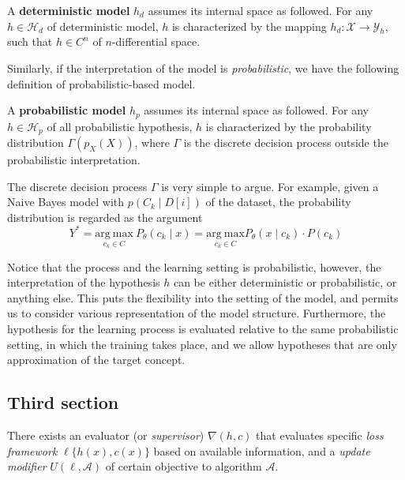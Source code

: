 \begin{definition}
    A \textbf{deterministic model} $h_{d}$ assumes its internal space as followed. For any $h\in\mathcal{H}_{d}$ of deterministic model, $h$ is characterized by the mapping $h_{d}:\mathcal{X}\to \mathcal{Y}_{h}$, such that $h\in C^{n}$ of $n$-differential space. 
\end{definition}

Similarly, if the interpretation of the model is \textit{probabilistic}, we have the following definition of probabilistic-based model. 
\begin{definition}
    A \textbf{probabilistic model} $h_{p}$ assumes its internal space as followed. For any $h\in\mathcal{H}_{p}$ of all probabilistic hypothesis, $h$ is characterized by the probability distribution $\Gamma(p_{X}(X))$, where $\Gamma$ is the discrete decision process outside the probabilistic interpretation.
\end{definition}

The discrete decision process $\Gamma$ is very simple to argue. For example, given a Naive Bayes model with $p(C_{k}\mid D[i])$ of the dataset, the probability distribution is regarded as the argument $$Y^{*}=\underset{c_{k}\in C}{\mathrm{arg\:max}}\:P_{\theta}(c_{k}\mid x)=\underset{c_{k}\in C}{\mathrm{arg\:max}}P_{\theta}(x\mid c_{k})\cdot P(c_{k})$$

Notice that the process and the learning setting is probabilistic, however, the interpretation of the hypothesis $h$ can be either deterministic or probabilistic, or anything else. This puts the flexibility into the setting of the model, and permits us to consider various representation of the model structure. Furthermore, the hypothesis for the learning process is evaluated relative to the same probabilistic setting, in which the training takes place, and we allow hypotheses that are only approximation of the target concept.

\subsection{Third section}

There exists an evaluator (or \textit{supervisor}) $\nabla (h,c)$ that evaluates specific \textit{loss framework} $\ell\{h(x),c(x)\}$ based on available information, and a \textit{update modifier} $U(\ell,\mathcal{A})$ of certain objective to algorithm $\mathcal{A}$. 
    
